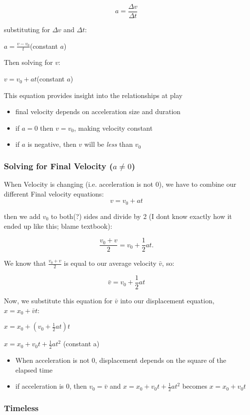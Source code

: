 \documentclass{article}
\begin{document}
\[ a = \frac{\Delta{v}}{\Delta{t}}\]

substituting for $\Delta{v}$ and $\Delta{t}$:

$ a = \frac{v - v_0}{t} $(constant $a$)

Then solving for $v$:

$v = v_0 + at$(constant $a$)

This equation provides insight into the relationships at play
\begin{itemize}
\item final velocity depends on acceleration size and duration
\item if $a=0$ then $v = v_0$, making velocity constant
\item if $a$ is negative, then $v$ will be \emph{less} than $v_0$
\end{itemize}

\subsubsection{Solving for Final Velocity ($ a \neq  0$)}

When Velocity is changing (i.e. acceleration is not 0), we have to combine our different Final velocity equations:
\[ v = v_0 + at \]

then we add $v_0$ to both(?) sides and divide by 2 (I dont know exactly how it ended up like this; blame textbook):

\[\frac{v_0 + v}{2} = v_0 + \frac{1}{2}at.\]

We know that $\frac{v_0 + v}{2}$ is equal to our average velocity $\bar{v}$, so:

\[ \bar{v} = v_0 + \frac{1}{2}at\]

Now, we substitute this equation for $\bar{v}$ into our displacement equation, $x = x_0 + \bar{v}t$:

$ x = x_0 + (v_0 + \frac{1}{2}at)t$

$ x = x_0 + v_0t + \frac{1}{2}at^2$ (constant a)

\begin{itemize}
\item When acceleration is not 0, displacement depends on the square of the elapsed time
\item if acceleration is 0, then $v_0 = \bar{v}$ and $ x = x_0 + v_0 t + \frac{1}{2}at^2$ becomes $ x = x_0 + v_0 t$
\end{itemize}

\subsubsection{Timeless}
\end{document}
